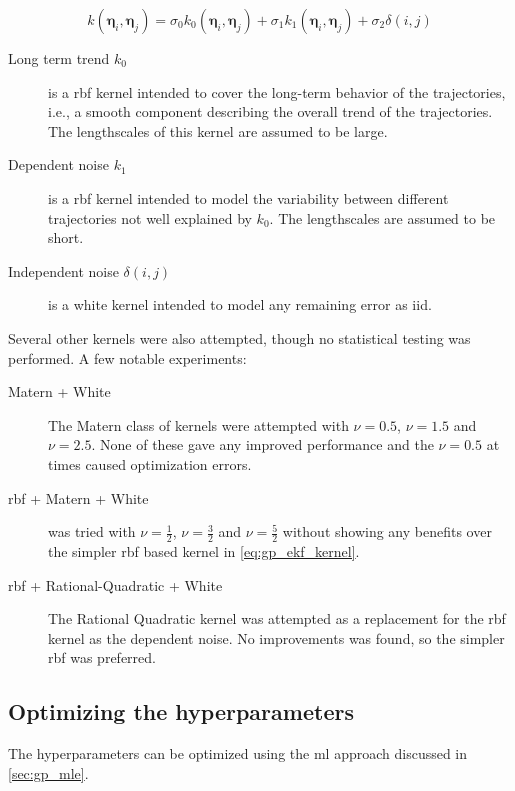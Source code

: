 \begin{equation}\label{eq:gp_ekf_kernel}
    k(\boldsymbol{\eta}_i, \boldsymbol{\eta}_j) = \sigma_0 k_0(\boldsymbol{\eta}_i, \boldsymbol{\eta}_j) + \sigma_1 k_1(\boldsymbol{\eta}_i, \boldsymbol{\eta}_j) +  \sigma_2 \delta(i, j)
\end{equation}

\begin{description}
    \item[Long term trend $k_0$] is a \acrshort{rbf} kernel intended to cover the long-term behavior of the trajectories, i.e., a smooth component describing the overall trend of the trajectories. The lengthscales of this kernel are assumed to be large.
    \item[Dependent noise $k_1$] is a \acrshort{rbf} kernel intended to model the variability between different trajectories not well explained by $k_0$. The lengthscales are assumed to be short.
    \item[Independent noise $\delta(i, j)$] is a white kernel intended to model any remaining error as \acrshort{iid}.
\end{description}

Several other kernels were also attempted, though no statistical testing was performed. A few notable experiments:
\begin{description}
    \item[Matern + White] The Matern class of kernels were attempted with $\nu=0.5$, $\nu=1.5$ and $\nu=2.5$. None of these gave any improved performance and the $\nu=0.5$ at times caused optimization errors.
    \item[\acrshort{rbf} + Matern + White] was tried with $\nu=\frac{1}{2}$, $\nu=\frac{3}{2}$ and $\nu=\frac{5}{2}$ without showing any benefits over the simpler \acrshort{rbf} based kernel in \cref{eq:gp_ekf_kernel}.
    \item[\acrshort{rbf} + Rational-Quadratic + White] The Rational Quadratic kernel was attempted as a replacement for the \acrshort{rbf} kernel as the dependent noise. No improvements was found, so the simpler \acrshort{rbf} was preferred.
\end{description}


\subsection{Optimizing the hyperparameters}
The hyperparameters can be optimized using the \acrshort{ml} approach discussed in \cref{sec:gp_mle}.

